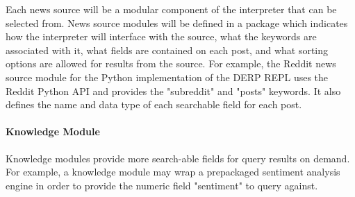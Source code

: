 Each news source will be a modular component of the interpreter that can be selected from. News source modules will be defined in a package which indicates how the interpreter will interface with the source, what the keywords are associated with it, what fields are contained on each post, and what sorting options are allowed for results from the source. For example, the Reddit news source module for the Python implementation of the DERP REPL uses the Reddit Python API and provides the "subreddit" and "posts" keywords. It also defines the name and data type of each searchable  field for each post. 

\paragraph{Knowledge Module}
Knowledge modules provide more search-able fields for query results on demand. For example, a knowledge module may wrap a prepackaged sentiment analysis engine in order to provide the numeric field "sentiment" to query against. 
